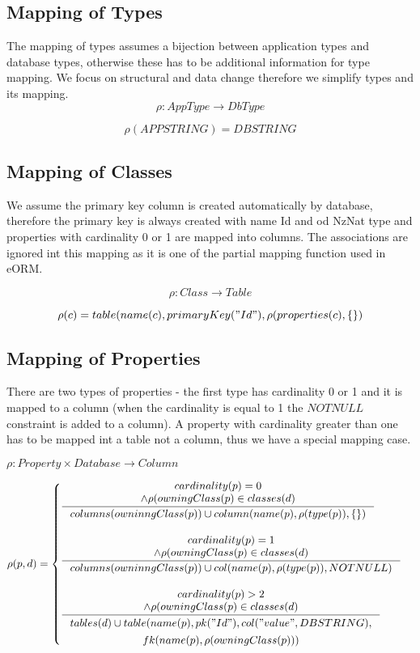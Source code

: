 \documentclass[11pt]{article}
\begin{document}
\subsection{Mapping of Types}
The mapping of types assumes a bijection between application types and database types, otherwise these has to be additional information for type mapping. We focus on structural and data change therefore we simplify types and its mapping.
$$
\rho : AppType \rightarrow DbType
$$

$$
\rho(APPSTRING) = DBSTRING
$$


\subsection{Mapping of Classes}
We assume the primary key column is created automatically by database, therefore the primary key is always created with name Id and od NzNat type and properties with cardinality 0 or 1 are mapped into columns. The associations are ignored int this mapping as it is one of the partial mapping function used in eORM.

$$
\rho : Class \rightarrow Table
$$

$$
\rho(c) = table(name(c), primaryKey("Id"), \rho(properties(c), \{ \})
$$

\subsection{Mapping of Properties}
There are two types of properties - the first type has cardinality 0 or 1 and it is mapped to a column (when the cardinality is equal to 1 the $NOTNULL$ constraint is added to a column). A property with cardinality greater than one has to be mapped int a table not a column, thus we have a special mapping case.



$
\rho : Property \times Database \rightarrow Column 
$

$\rho(p, d) = \begin{cases}
 \inference{cardinality(p) = 0 \\ \wedge \rho(owningClass(p) \in classes(d)}{columns(owninngClass(p)) \cup column(name(p), \rho(type(p)), \{ \})} \\ \\
 
 \inference{cardinality(p) = 1 \\ \wedge \rho(owningClass(p) \in classes(d)}{columns(owninngClass(p)) \cup col(name(p), \rho(type(p)), NOTNULL)} \\ \\
 
 \inference{cardinality(p) > 2 \\ \wedge \rho(owningClass(p) \in classes(d)}{\begin{gathered} tables(d) \cup table(name(p), pk("Id"), col("value", DBSTRING), \\ fk(name(p), \rho(owningClass(p))) \end{gathered}}
 \end{cases}$
\end{document}
